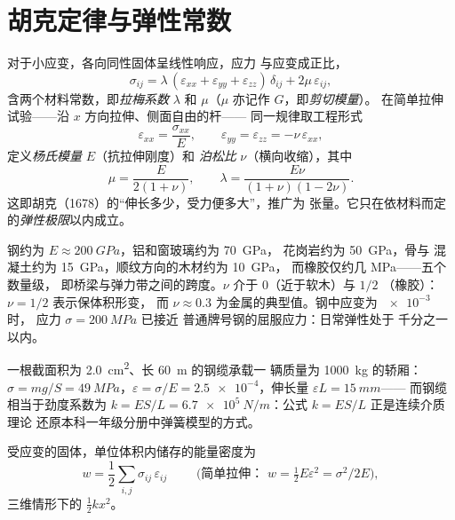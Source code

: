 \section{胡克定律与弹性常数}

\begin{theorem}[线性各向同性弹性]\label{thm:b3:continuum-elasticity:hooke}
对于小应变，各向同性固体呈线性响应，应力
与应变成正比，
\[
\sigma_{ij} = \lambda\,(\varepsilon_{xx} + \varepsilon_{yy} +
\varepsilon_{zz})\,\delta_{ij} + 2\mu\,\varepsilon_{ij} ,
\]
含两个材料常数，即\emph{拉梅系数} $\lambda$ 和
$\mu$（$\mu$ 亦记作 $G$，即\emph{剪切模量}）。
在简单拉伸试验——沿 $x$ 方向拉伸、侧面自由的杆——
同一规律取工程形式
\[
\varepsilon_{xx} = \frac{\sigma_{xx}}{E} , \qquad
\varepsilon_{yy} = \varepsilon_{zz} = -\nu\,\varepsilon_{xx} ,
\]
定义\emph{杨氏模量} $E$（抗拉伸刚度）和
\emph{泊松比} $\nu$（横向收缩），其中
\[
\mu = \frac{E}{2(1 + \nu)} , \qquad
\lambda = \frac{E\nu}{(1 + \nu)(1 - 2\nu)} .
\]
这即胡克（1678）的“伸长多少，受力便多大”，推广为
张量。它只在依材料而定的\emph{弹性极限}以内成立。
\end{theorem}
\admitted

\begin{remark}[数量级]\label{rem:b3:continuum-elasticity:orders}
钢约为 $E \approx \qty{200}{GPa}$，铝和窗玻璃约为 \qty{70}{GPa}，
花岗岩约为 \qty{50}{GPa}，骨与
混凝土约为 \qty{15}{GPa}，顺纹方向的木材约为 \qty{10}{GPa}，
而橡胶仅约几 MPa——五个数量级，
即桥梁与弹力带之间的跨度。$\nu$ 介于 $0$（近于软木）与 $1/2$
（橡胶）：$\nu = 1/2$ 表示保体积形变，
而 $\nu \approx 0.3$ 为金属的典型值。钢中应变为 $\num{e-3}$ 时，
应力 $\sigma = \qty{200}{MPa}$ 已接近
普通牌号钢的屈服应力：日常弹性处于
千分之一以内。
\end{remark}

\begin{example}[电梯缆绳]\label{ex:b3:continuum-elasticity:cable}
一根截面积为 \qty{2.0}{cm^2}、长 \qty{60}{m} 的钢缆承载一
辆质量为 \qty{1000}{kg} 的轿厢：$\sigma = mg/S = \qty{49}{MPa}$，$\varepsilon =
\sigma/E = \num{2.5e-4}$，伸长量 $\varepsilon L = \qty{15}{mm}$——
而钢缆相当于劲度系数为 $k = ES/L =
\qty{6.7e5}{N/m}$：公式 $k = ES/L$ 正是连续介质理论
还原本科一年级分册中弹簧模型的方式。
\end{example}

\begin{proposition}[弹性能]\label{prop:b3:continuum-elasticity:energy}
受应变的固体，单位体积内储存的能量密度为
\[
w = \frac12\sum_{i,j}\sigma_{ij}\,\varepsilon_{ij}
\qquad\text{ (简单拉伸： } w = \tfrac12 E\varepsilon^2 =
\sigma^2/2E\text{)} ,
\]
三维情形下的 $\tfrac12 kx^2$。
\end{proposition}

